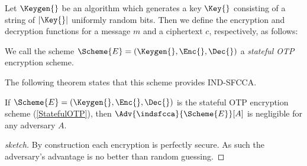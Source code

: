\begin{definition}\label{StatefulOTP}
  Let \(\Keygen{}\) be an algorithm which generates a key \(\Key{}\) consisting 
  of a string of \(|\Key{}|\) uniformly random bits.
  Then we define the encryption and decryption functions for a message \(m\) 
  and a ciphertext \(c\), respectively, as follows:
  \begin{center}
    \normalfont{}
    \begin{minipage}[t]{0.4\textwidth}
      \begin{algorithmic}
            \State{\Return{$\bot$}}
          \EndIf{}
        \EndFunction{}
      \end{algorithmic}
    \end{minipage}%
    \vline%
    \begin{minipage}[t]{0.4\textwidth}
      \begin{algorithmic}
            \State{\Return{$\bot$}}
          \EndIf{}
        \EndFunction{}
      \end{algorithmic}
    \end{minipage}
  \end{center}
  We call the scheme \(\Scheme{E} = (\Keygen{}, \Enc{}, \Dec{})\) 
  a \emph{stateful \ac{OTP}} encryption scheme.
\end{definition}

The following theorem states that this scheme provides \ac{IND-SFCCA}.

\begin{theorem}
  If \(\Scheme{E} = (\Keygen{}, \Enc{}, \Dec{})\) is the stateful \ac{OTP} 
  encryption scheme (\cref{StatefulOTP}),
  then \(\Adv{\indsfcca}{\Scheme{E}}[ A ]\) is negligible for any adversary 
  \(A\).
\end{theorem}
\begin{proof}[sketch]
  By construction each encryption is perfectly secure.
  As such the adversary's advantage is no better than random guessing.
\end{proof}

